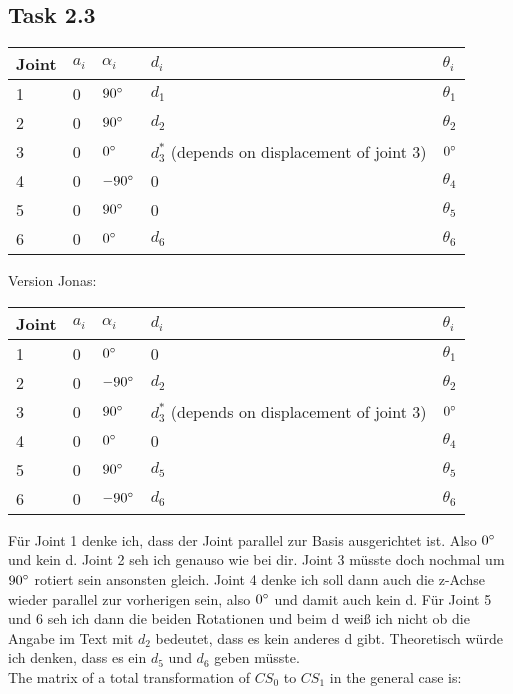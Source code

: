 \subsection*{Task 2.3}

\begin{center}
	\begin{tabular}{ | l | l | l | l | l |}
		\hline
		Joint & $a_{i}$ & $\alpha_{i}$ & $d_i$ & $\theta_i$ \\ \hline
		1 & 0 & $90\degree$ & $d_1$ & $\theta_1$\\ \hline
		2 & 0 & $90\degree$ & $d_2$ & $\theta_2$\\ \hline
		3 & 0 & $0\degree$ & $d^*_3$ (depends on displacement of joint 3) & $0\degree$\\ \hline
		4 & 0 & $-90\degree$ & 0 & $\theta_4$\\ \hline
		5 & 0 & $90\degree$ & 0 & $\theta_5$\\ \hline
		6 & 0 & $0\degree$ & $d_6$ & $\theta_6$\\ \hline
	\end{tabular}
\end{center}

Version Jonas:
\begin{center}
	\begin{tabular}{ | l | l | l | l | l |}
		\hline
		Joint & $a_{i}$ & $\alpha_{i}$ & $d_i$ & $\theta_i$ \\ \hline
		1 & 0 & $0\degree$ & 0 & $\theta_1$\\ \hline
		2 & 0 & $-90\degree$ & $d_2$ & $\theta_2$\\ \hline
		3 & 0 & $90\degree$ & $d^*_3$ (depends on displacement of joint 3) & $0\degree$\\ \hline
		4 & 0 & $0\degree$ & 0 & $\theta_4$\\ \hline
		5 & 0 & $90\degree$ & $d_5$ & $\theta_5$\\ \hline
		6 & 0 & $-90\degree$ & $d_6$ & $\theta_6$\\ \hline
	\end{tabular}
\end{center}
Für Joint 1 denke ich, dass der Joint parallel zur Basis ausgerichtet ist. Also $0\degree$ und kein d. Joint 2 seh ich genauso wie bei dir. Joint 3 müsste doch nochmal um $90\degree$ rotiert sein ansonsten gleich. Joint 4 denke ich soll dann auch die z-Achse wieder parallel zur vorherigen sein, also $0\degree$ und damit auch kein d. Für Joint 5 und 6 seh ich dann die beiden Rotationen und beim d weiß ich nicht ob die Angabe im Text mit $d_2$ bedeutet, dass es kein anderes d gibt. Theoretisch würde ich denken, dass es ein $d_5$ und $d_6$ geben müsste.
\\
The matrix of a total transformation of $CS_0$ to $CS_1$ in the general case is:

